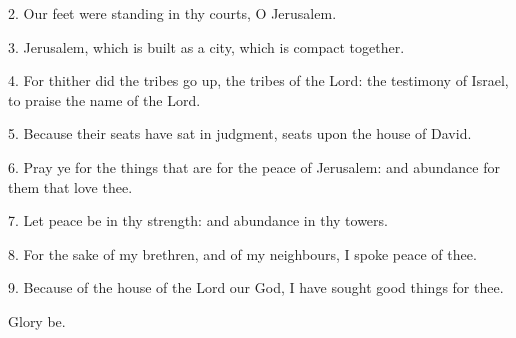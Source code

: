 
2. Our feet were standing in thy courts, O Jerusalem.

3. Jerusalem, which is built as a city, which is compact together.

4. For thither did the tribes go up, the tribes of the Lord: the testimony of Israel, to praise the name of the Lord.

5. Because their seats have sat in judgment, seats upon the house of David.

6. Pray ye for the things that are for the peace of Jerusalem: and abundance for them that love thee.

7. Let peace be in thy strength: and abundance in thy towers.

8. For the sake of my brethren, and of my neighbours, I spoke peace of thee.

9. Because of the house of the Lord our God, I have sought good things for thee.

Glory be. 